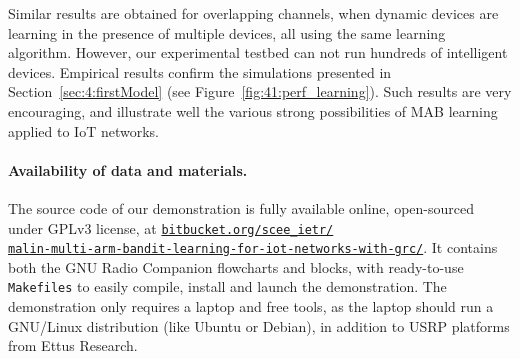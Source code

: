Similar results are obtained for overlapping channels, when dynamic devices are learning in the presence of multiple devices, all using the same learning algorithm.
However, our experimental testbed can not run hundreds of intelligent devices.
Empirical results confirm the simulations presented in Section~\ref{sec:4:firstModel} (see Figure~\ref{fig:41:perf_learning}).
Such results are very encouraging, and illustrate well the various strong possibilities of MAB learning applied to IoT networks.



\paragraph{Availability of data and materials.}
%
The source code of our demonstration is fully available online, open-sourced under GPLv3 license, at
\href{https://bitbucket.org/scee_ietr/malin-multi-arm-bandit-learning-for-iot-networks-with-grc}{\texttt{bitbucket.org/scee\_ietr/\\malin-multi-arm-bandit-learning-for-iot-networks-with-grc/}}.
%
It contains both the GNU Radio Companion flowcharts and blocks, with ready-to-use \texttt{Makefiles} to easily compile, install and launch the demonstration.
The demonstration only requires a laptop and free tools,
as the laptop should run a GNU/Linux distribution (like Ubuntu or Debian),
in addition to USRP platforms from Ettus Research.


